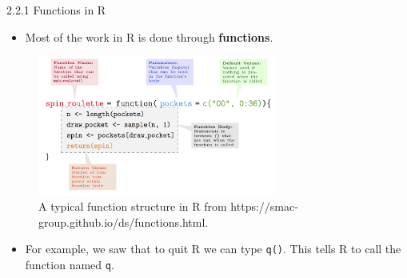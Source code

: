 \documentclass[
  9pt,
  a4paper,
  ignorenonframetext,
  notheorems]{beamer}
\providecommand{\tightlist}{%
  \setlength{\itemsep}{0pt}\setlength{\parskip}{0pt}}\usepackage{longtable,booktabs,array}
\begin{document}
\begin{frame}[fragile]{2.2.1 Functions in R}
\protect\hypertarget{functions-in-r}{}
\begin{itemize}
\tightlist
\item
  Most of the work in R is done through \textbf{functions}.
\end{itemize}

\begin{figure}

{\centering \includegraphics[width=0.7\textwidth,height=\textheight]{images/functionstructure.png}

}

\caption{A typical function structure in R from
https://smac-group.github.io/ds/functions.html.}

\end{figure}

\begin{itemize}
\tightlist
\item
  For example, we saw that to quit R we can type \texttt{q()}. This
  tells R to call the function named \texttt{q}.
\end{itemize}
\end{frame}
\end{document}
